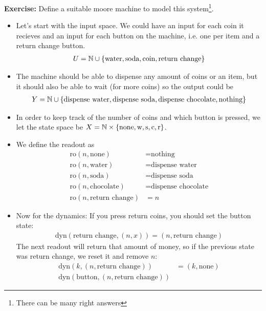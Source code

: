 \textbf{Exercise:} Define a suitable moore machine to model this system\footnote{There can be many right answers}.
\begin{itemize}
  \item Let's start with the input space.
    We could have an input for each coin it recieves and an input for each button on the machine, i.e. one per item and a return change button.
    \begin{align*}
      U = \mathbb{N} \cup \{\text{water},\text{soda},\text{coin},\text{return change}\}
    \end{align*}
  \item The machine should be able to dispense any amount of coins or an item, but it should also be able to wait (for more coins) so the output could be
    \begin{align*}
      Y =\mathbb{N} \cup \{\text{dispense water},\text{dispense soda},\text{dispense chocolate},\text{nothing}\}
    \end{align*}
  \item In order to keep track of the number of coins and which button is pressed, we let the state space be $X = \mathbb{N} \times \{\text{none}, \text{w},\text{s},\text{c},\text{r}\}$.
  \item We define the readout as
    \begin{align*}
      \text{ro}(n,\text{none}) 
      &= \text{nothing}
      \\
      \text{ro}(n,\text{water}) 
      &= \text{dispense water}
      \\
      \text{ro}(n,\text{soda}) 
      &= \text{dispense soda}
      \\
      \text{ro}(n,\text{chocolate}) 
      &= \text{dispense chocolate}
      \\
      \text{ro}(n,\text{return change}) 
      &= n
    \end{align*}
  \item Now for the dynamics: 
    If you press return coins, you should set the button state:
    \begin{align*}
      \text{dyn}(\text{return change},(n,x)) = (n,\text{return change})
    \end{align*}
    The next readout will return that amount of money, so if the previous state was return change, we reset it and remove $n$: 
    \begin{align*}
      \text{dyn}(k,(n,\text{return change})) 
      &= (k,\text{none})
      \\
      \text{dyn}(\text{button},(n,\text{return change})) 

\end{align*}
\end{itemize}

